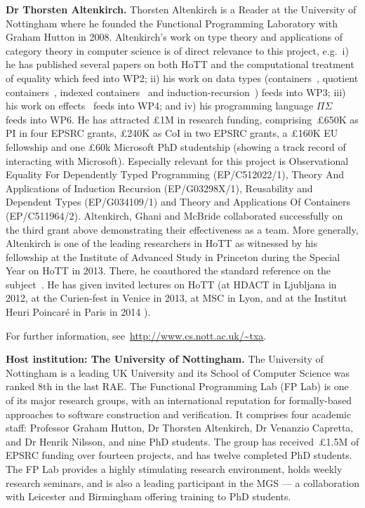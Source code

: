 \documentclass[a4paper,11pt]{article}
\newcommand{\eg}{{e.g.}\ }
\begin{document}
\newpage \textbf{Dr Thorsten Altenkirch.}  Thorsten Altenkirch is a
Reader at the University of Nottingham where he founded the Functional
Programming Laboratory with Graham Hutton in 2008. Altenkirch's
work on type theory and applications of category theory
in computer science is of direct relevance to this project, \eg i) he has
published several papers on both HoTT and the computational treatment
of equality
\cite{altenkirch:extSetoids,alti:ott-conf,alti:csl12,alti:tlca13-hedberg}
which feed into WP2; ii) his work on data types 
(containers~\cite{alti:cont-tcs}, quotient
containers~\cite{alti:mpc04}, indexed
containers~\cite{altenkirchGhaniHancockMcBrideMorris:indexedContainers}
and
induction-recursion~\cite{ghani:fibredIR})
feeds into WP3; iii) his work on
effects~\cite{alti:catind2} feeds into WP4; and iv) his programming
language $\Pi\Sigma$~\cite{alti:pisigma-new} feeds into WP6. He
has attracted \pounds 1M in research funding,
comprising~\pounds650K  as PI in four EPSRC grants, \pounds240K
as CoI in two EPSRC grants,  a \pounds160K EU fellowship and
one \pounds 60k Microsoft PhD 
studentship (showing a track record of interacting with
Microsoft). Especially relevant for this project is
Observational Equality For Dependently Typed Programming
(EP/C512022/1), Theory And Applications of Induction Recursion
(EP/G03298X/1), Reusability and Dependent Types (EP/G034109/1) and
Theory and Applications Of Containers (EP/C511964/2).  Altenkirch,
Ghani and McBride collaborated successfully on the third grant above
demonstrating their effectiveness as a team. More
generally, Altenkirch is one of the leading researchers in HoTT as
witnessed by his fellowship at the Institute of Advanced Study in
Princeton during the Special Year on HoTT in 2013. There, he
coauthored the standard reference on the subject~\cite{hott-book}.  He
has given invited lectures on HoTT (at HDACT in Ljubljana in 2012, at
the Curien-fest in Venice in 2013, at MSC in Lyon, and at the Institut
Henri Poincar\'e in Paris in 2014 \cite{txa-ihp14}).

For further information, see~\url{http://www.cs.nott.ac.uk/~txa}.

\textbf{Host institution: The University of Nottingham.}  The
University of Nottingham is a leading UK University 
and its School of Computer Science was ranked 8th in the last RAE. The Functional Programming Lab (FP Lab)
is one of its major research groups, with an international
reputation for formally-based approaches to software
construction and verification.  It comprises four
academic staff: Professor Graham Hutton, Dr Thorsten Altenkirch, Dr
Venanzio Capretta, and Dr Henrik Nilsson, and nine PhD students.
The group has received~\pounds1.5M of EPSRC funding over fourteen
projects, and has twelve completed PhD students.
The FP Lab provides a highly stimulating research environment,
holds weekly research seminars, and is also a leading participant in the MGS
--- a collaboration with Leicester and Birmingham offering training
to PhD students.
\noindent
\end{document}
